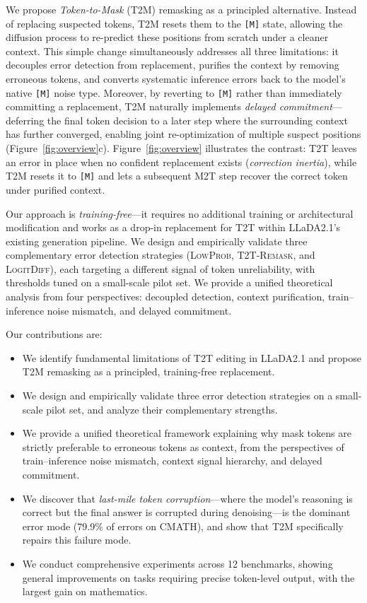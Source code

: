 \documentclass{article}
\newcommand{\mask}{\texttt{[M]}}
\newcommand{\MtoT}{\textrm{M2T}}
\newcommand{\TtoT}{\textrm{T2T}}
\newcommand{\TtoM}{\textrm{T2M}}
\begin{document}
We propose \emph{Token-to-Mask} (\TtoM{}) remasking as a principled alternative. Instead of replacing suspected tokens, \TtoM{} resets them to the \mask{} state, allowing the diffusion process to re-predict these positions from scratch under a cleaner context. This simple change simultaneously addresses all three limitations: it decouples error detection from replacement, purifies the context by removing erroneous tokens, and converts systematic inference errors back to the model's native \mask{} noise type. Moreover, by reverting to \mask{} rather than immediately committing a replacement, \TtoM{} naturally implements \emph{delayed commitment}---deferring the final token decision to a later step where the surrounding context has further converged, enabling joint re-optimization of multiple suspect positions (Figure~\ref{fig:overview}c). Figure~\ref{fig:overview} illustrates the contrast: \TtoT{} leaves an error in place when no confident replacement exists (\emph{correction inertia}), while \TtoM{} resets it to \mask{} and lets a subsequent \MtoT{} step recover the correct token under purified context.

Our approach is \emph{training-free}---it requires no additional training or architectural modification and works as a drop-in replacement for \TtoT{} within LLaDA2.1's existing generation pipeline. We design and empirically validate three complementary error detection strategies (\textsc{LowProb}, \textsc{T2T-Remask}, and \textsc{LogitDiff}), each targeting a different signal of token unreliability, with thresholds tuned on a small-scale pilot set. We provide a unified theoretical analysis from four perspectives: decoupled detection, context purification, train--inference noise mismatch, and delayed commitment.

Our contributions are:
\begin{itemize}
    \item We identify fundamental limitations of \TtoT{} editing in LLaDA2.1 and propose \TtoM{} remasking as a principled, training-free replacement.
    \item We design and empirically validate three error detection strategies on a small-scale pilot set, and analyze their complementary strengths.
    \item We provide a unified theoretical framework explaining why mask tokens are strictly preferable to erroneous tokens as context, from the perspectives of train--inference noise mismatch, context signal hierarchy, and delayed commitment.
    \item We discover that \emph{last-mile token corruption}---where the model's reasoning is correct but the final answer is corrupted during denoising---is the dominant error mode (79.9\% of errors on CMATH), and show that \TtoM{} specifically repairs this failure mode.
    \item We conduct comprehensive experiments across 12 benchmarks, showing general improvements on tasks requiring precise token-level output, with the largest gain on mathematics.
\end{itemize}
\end{document}
